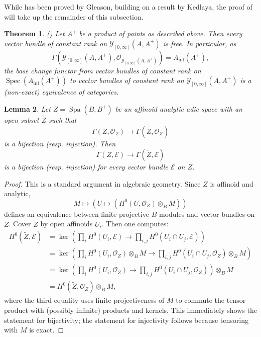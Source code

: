 \documentclass[10pt,twoside]{article}
\numberwithin{equation}{section}
\theoremstyle{plain}
\newtheorem{mythm}{Theorem}[section]
\newtheorem{mylemma}[mythm]{Lemma}
\theoremstyle{definition}
\DeclareMathOperator{\Spec}{Spec}
\DeclareMathOperator{\Spa}{Spa}
\newcommand{\MCE}{\mathcal{E}}
\newcommand{\MCO}{\mathcal{O}}
\newcommand{\MCY}{\mathcal{Y}}
\DeclareMathOperator{\Inf}{inf}
\newcommand{\Ainf}{A_{\Inf}}
\newcommand{\Ycc}{\MCY_{[0,\infty]}}
\begin{document}
While  has been proved by Gleason, building on a result by Kedlaya, the proof of  will take up the remainder of this subsection.


\begin{mythm}\label{lemmaAnchütz}\emph{(\cite[Proposition 2.1.17]{GleaPhD})}
    Let \(A^+\) be a product of points as described above. Then every vector bundle of constant rank on \(\Ycc(A,A^+)\) is free. In particular, as
    \[\Gamma(\Ycc(A,A^+),\MCO_{\Ycc(A,A^+)})=\Ainf(A^+),\]
    the base change functor from vector bundles of constant rank on \(\Spec(\Ainf(A^+))\) to vector bundles of constant rank on \(\Ycc(A,A^+)\) is a (non-exact) equivalence of categories.
\end{mythm}





\begin{mylemma}\label{sufficesForStructureSheaf}
    Let \(Z=\Spa(B,B^+)\) be an affinoid analytic adic space with an open subset \(\tilde Z\) such that
\[\Gamma(Z,\MCO_Z)\longrightarrow \Gamma(\tilde Z, \MCO_Z)\]
is a bijection (resp. injection). Then
\[\Gamma(Z,\MCE)\longrightarrow \Gamma(\tilde Z, \MCE)\]
is a bijection (resp. injection) for every vector bundle \(\MCE\) on \(Z\).
\end{mylemma}
\begin{proof}
    This is a standard argument in algebraic geometry. Since \(Z\) is affinoid and analytic,
    \[M\mapsto \left(U\mapsto (H^0(U,\MCO_Z)\otimes_{B} M)\right)\]
    defines an equivalence between finite projective \(B\)-modules and vector bundles on \(Z\). Cover \(\tilde Z\) by open affinoids \(U_i\). Then one computes:
\begin{align*}H^0(\tilde Z,\MCE)
&=\ker\left(\prod_i H^0(U_i,\MCE)\to \prod_{i,j} H^0(U_i\cap U_j,\MCE)\right)\\
&=\ker\left(\prod_i H^0(U_i,\MCO_Z)\otimes_{B} M\to \prod_{i,j} H^0(U_i\cap U_j,\MCO_Z)\otimes_{B} M\right)\\
&=\ker\left(\prod_i H^0(U_i,\MCO_Z)\to \prod_{i,j} H^0(U_i\cap U_j,\MCO_Z)\right)\otimes_{B} M\\
&=H^0(\tilde Z,\MCO_Z)\otimes_B M,
\end{align*}
where the third equality uses finite projectiveness of \(M\) to commute the tensor product with (possibly infinite) products and kernels. This immediately shows the statement for bijectivity; the statement for injectivity follows because tensoring with \(M\) is exact.
\end{proof}
\end{document}
